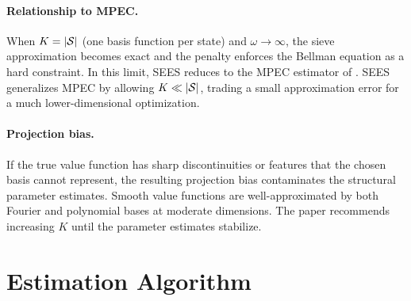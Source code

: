 \documentclass[11pt]{article}
\begin{document}
\paragraph{Relationship to MPEC.}
When $K = |\mathcal{S}|$ (one basis function per state) and $\omega \to \infty$, the sieve approximation becomes exact and the penalty enforces the Bellman equation as a hard constraint. In this limit, SEES reduces to the MPEC estimator of \citet{suJudd2012}. SEES generalizes MPEC by allowing $K \ll |\mathcal{S}|$, trading a small approximation error for a much lower-dimensional optimization.

\paragraph{Projection bias.}
If the true value function has sharp discontinuities or features that the chosen basis cannot represent, the resulting projection bias contaminates the structural parameter estimates. Smooth value functions are well-approximated by both Fourier and polynomial bases at moderate dimensions. The paper recommends increasing $K$ until the parameter estimates stabilize.


\section{Estimation Algorithm}
\end{document}
